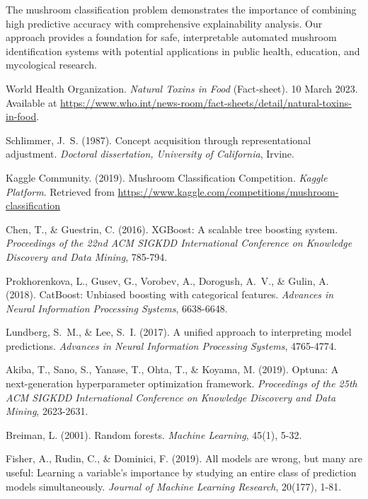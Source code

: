 \documentclass[11pt,a4paper]{article}
\begin{document}
The mushroom classification problem demonstrates the importance of combining high predictive accuracy with comprehensive explainability analysis. Our approach provides a foundation for safe, interpretable automated mushroom identification systems with potential applications in public health, education, and mycological research.

\begin{thebibliography}{9}

World Health Organization. \textit{Natural Toxins in Food} (Fact-sheet). 
10 March 2023. Available at \url{https://www.who.int/news-room/fact-sheets/detail/natural-toxins-in-food}.

Schlimmer, J.\ S. (1987). Concept acquisition through representational adjustment. \textit{Doctoral dissertation, University of California}, Irvine.

Kaggle Community. (2019). Mushroom Classification Competition. \textit{Kaggle Platform}. Retrieved from \url{https://www.kaggle.com/competitions/mushroom-classification}

Chen, T., \& Guestrin, C. (2016). XGBoost: A scalable tree boosting system. \textit{Proceedings of the 22nd ACM SIGKDD International Conference on Knowledge Discovery and Data Mining}, 785-794.

Prokhorenkova, L., Gusev, G., Vorobev, A., Dorogush, A.\ V., \& Gulin, A. (2018). CatBoost: Unbiased boosting with categorical features. \textit{Advances in Neural Information Processing Systems}, 6638-6648.

Lundberg, S.\ M., \& Lee, S.\ I. (2017). A unified approach to interpreting model predictions. \textit{Advances in Neural Information Processing Systems}, 4765-4774.

Akiba, T., Sano, S., Yanase, T., Ohta, T., \& Koyama, M. (2019). Optuna: A next-generation hyperparameter optimization framework. \textit{Proceedings of the 25th ACM SIGKDD International Conference on Knowledge Discovery and Data Mining}, 2623-2631.

Breiman, L. (2001). Random forests. \textit{Machine Learning}, 45(1), 5-32.

Fisher, A., Rudin, C., \& Dominici, F. (2019). All models are wrong, but many are useful: Learning a variable's importance by studying an entire class of prediction models simultaneously. \textit{Journal of Machine Learning Research}, 20(177), 1-81.

\end{thebibliography}
\end{document}
